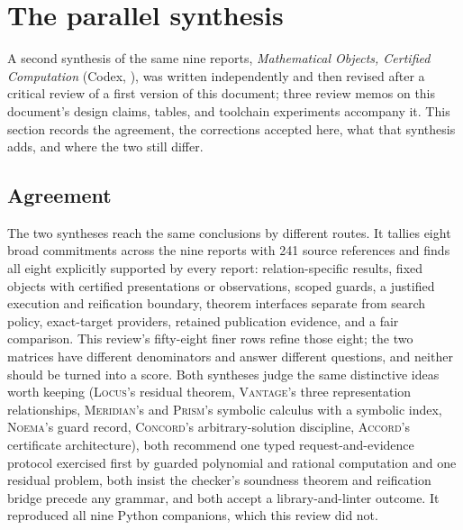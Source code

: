 \documentclass[11pt,a4paper]{article}
\newcommand{\code}[1]{\texttt{\detokenize{#1}}}
\newcommand{\Lc}{\textsc{Locus}}
\newcommand{\Ac}{\textsc{Accord}}
\newcommand{\Cc}{\textsc{Concord}}
\newcommand{\Md}{\textsc{Meridian}}
\newcommand{\Nm}{\textsc{Noema}}
\newcommand{\Pm}{\textsc{Prism}}
\newcommand{\Vt}{\textsc{Vantage}}
\theoremstyle{definition}
\begin{document}
\section{The parallel synthesis}\label{sec:parallel}
A second synthesis of the same nine reports, \emph{Mathematical Objects, Certified Computation} (Codex, \code{docs/round-2/synthesis/}), was written independently and then revised after a critical review of a first version of this document; three review memos on this document's design claims, tables, and toolchain experiments accompany it. This section records the agreement, the corrections accepted here, what that synthesis adds, and where the two still differ.

\subsection{Agreement}
The two syntheses reach the same conclusions by different routes. It tallies eight broad commitments across the nine reports with 241 source references and finds all eight explicitly supported by every report: relation-specific results, fixed objects with certified presentations or observations, scoped guards, a justified execution and reification boundary, theorem interfaces separate from search policy, exact-target providers, retained publication evidence, and a fair comparison. This review's fifty-eight finer rows refine those eight; the two matrices have different denominators and answer different questions, and neither should be turned into a score. Both syntheses judge the same distinctive ideas worth keeping (\Lc's residual theorem, \Vt's three representation relationships, \Md's and \Pm's symbolic calculus with a symbolic index, \Nm's guard record, \Cc's arbitrary-solution discipline, \Ac's certificate architecture), both recommend one typed request-and-evidence protocol exercised first by guarded polynomial and rational computation and one residual problem, both insist the checker's soundness theorem and reification bridge precede any grammar, and both accept a library-and-linter outcome. It reproduced all nine Python companions, which this review did not.
\end{document}
